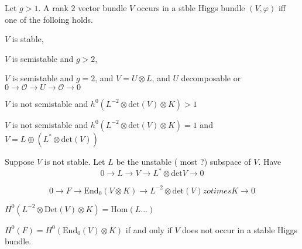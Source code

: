 \begin{proposition}
    Let $ g>1 $. A rank $2$ vector bundle $V$ occurs in a stble Higgs bundle $(V, \varphi) $ iff one of the folloing holds. 

    $V$ is stable,

    $V$ is semistable and $g>2$, 

    $V$ is semistable and $g=2$, and $V = U \otimes L$, 
    and $U$ decomposable or $0 \rightarrow  \mathcal{O} \rightarrow U \rightarrow \mathcal{O} \rightarrow 0 $

    $V$ is not semistable and $h^0 (L^{-2} \otimes \mathrm{det}(V) \otimes K ) > 1 $

    $V$ is not semistable and $h^0 (L^{-2} \otimes \mathrm{det}(V) \otimes K ) = 1 $ and 
    $V = L\oplus (L^* \otimes \mathrm{det}(V) ) $
    
\end{proposition}

Suppose $V$ is not stable. 
Let $ L$ be the unstable ( most ?) subspace of $V$. 
Have 
\begin{equation}
    0 \rightarrow  L \rightarrow  V \rightarrow  L^* \otimes \mathrm{det} V  \rightarrow  0 
\end{equation}

\begin{equation}
    0 \rightarrow  F \rightarrow  \mathrm{End} _0 ( V \otimes K) \rightarrow L^{-2} \otimes \mathrm{det} ( V) zotimes K \rightarrow  0 
\end{equation}

$H^0 ( L^{-2} \otimes \mathrm{Det} (V)  \otimes K ) = \mathrm{Hom} ( L...) $ 


$H^0 ( F) = H^0 ( \mathrm{End}_0 ( V) \otimes K ) $ 
if and only if $ V$ does not occur in a stable Higgs bundle. 














 

